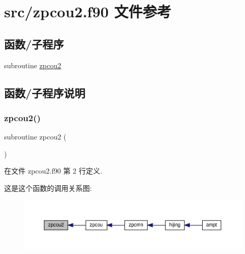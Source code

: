 \hypertarget{zpcou2_8f90}{}\section{src/zpcou2.f90 文件参考}
\label{zpcou2_8f90}
\subsection*{函数/子程序}
\begin{DoxyCompactItemize}
\item 
subroutine \mbox{\hyperlink{zpcou2_8f90_a4390f3a7aae2ff8557a01d30f19e971c}{zpcou2}}
\end{DoxyCompactItemize}


\subsection{函数/子程序说明}
\mbox{\label{zpcou2_8f90_a4390f3a7aae2ff8557a01d30f19e971c}} 
\subsubsection{\texorpdfstring{zpcou2()}{zpcou2()}}
{\footnotesize\ttfamily subroutine zpcou2 (\begin{DoxyParamCaption}{ }\end{DoxyParamCaption})}



在文件 zpcou2.\+f90 第 2 行定义.

这是这个函数的调用关系图\+:
\nopagebreak
\begin{figure}[H]
\begin{center}
\leavevmode
\includegraphics[width=350pt]{zpcou2_8f90_a4390f3a7aae2ff8557a01d30f19e971c_icgraph}
\end{center}
\end{figure}
